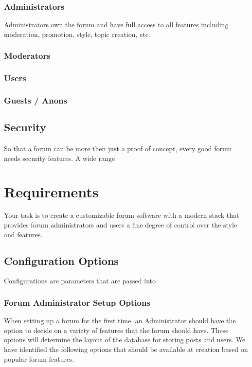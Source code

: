 \documentclass[]{article}
\begin{document}
\subsubsection{Administrators}
Administrators own the forum and have full access to all features including moderation, promotion, style, topic creation, etc.      

\subsubsection{Moderators}

\subsubsection{Users}

\subsubsection{Guests / Anons}

\subsection{Security}
\paragraph{}
So that a forum can be more then just a proof of concept, every good forum needs security features. A wide range

\section{Requirements}
\paragraph{}
Your task is to create a customizable forum software with a modern stack that provides forum administrators and users a fine degree of control over the style and features. 

\subsection{Configuration Options}
Configurations are parameters that are passed into  

\subsubsection{Forum Administrator Setup Options}
When setting up a forum for the first time, an Administrator should have the option to decide on a variety of features that the forum should have. These options will determine the layout of the database for storing posts and users. We have identified the following options that should be available at creation based on popular forum features.
\end{document}
